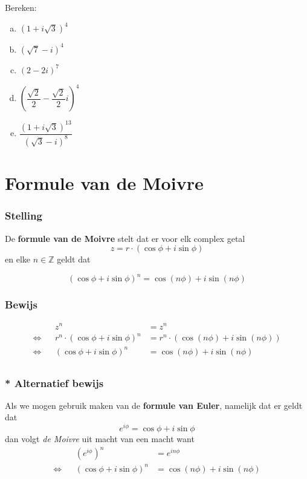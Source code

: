 \documentclass[12pt,twoside,a4paper]{article}
\begin{document}
\begin{oefening}
Bereken:
\begin{multicols}{2}
\begin{enumerate}[(a)]
  \itemsep.5em
  \item $\displaystyle \left(1+i\sqrt{3}\right)^4$
  \item $\displaystyle \left(\sqrt{7}-i\right)^4$
  \item $\displaystyle \left(2-2i\right)^7$
  \item $\displaystyle \left(\dfrac{\sqrt{2}}{2}-\dfrac{\sqrt{2}}{2}i\right)^4$
  \item $\displaystyle \dfrac{\left(1+i\sqrt{3}\right)^{13}}{\left(\sqrt{3}-i\right)^8}$
\end{enumerate}
\end{multicols}
\end{oefening}

\pagebreak

\section{Formule van de Moivre}

\subsubsection*{Stelling}
De {\bf formule van de Moivre} stelt dat er voor elk complex getal
\[z=r \cdot (\cos \phi + i\sin \phi)\]
en elke $n\in\mathbb{Z}$ geldt dat
\begin{mdframed}
  \[ \left( \cos \phi + i\sin \phi \right)^n = \cos( n\phi ) + i\sin( n\phi ) \]
\end{mdframed}

\subsubsection*{Bewijs}
\begin{align*}
     &&                        z^n &= z^n\\
  \Leftrightarrow && r^n \cdot (\cos \phi + i \sin \phi)^n &= r^n \cdot (\cos( n\phi ) + i\sin( n\phi ))\\
  \Leftrightarrow && (\cos \phi + i \sin \phi)^n &= \cos( n\phi ) + i\sin( n\phi )\\
\end{align*}

\subsubsection*{* Alternatief bewijs}
Als we mogen gebruik maken van de {\bf formule van Euler}, namelijk dat er geldt dat
\[e^{i\phi} = \cos\phi + i\sin\phi \]
dan volgt {\em de Moivre} uit macht van een macht want
\begin{align*}
     && \left(e^{i\phi}\right)^n &= e^{in\phi}\\
  \Leftrightarrow && (\cos \phi + i \sin \phi)^n &= \cos( n\phi ) + i\sin( n\phi )\\
\end{align*}
\end{document}
